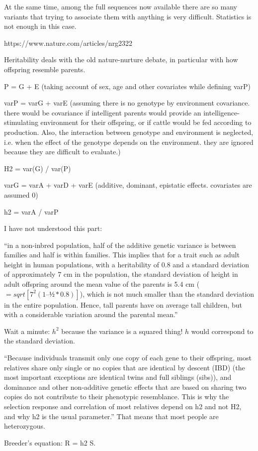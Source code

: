 \documentclass[../main.tex]{subfiles}
\begin{document}
At the same time, among the full sequences now available there are so 
many variants that trying to associate them with anything is very 
difficult. Statistics is not enough in this case.

https://www.nature.com/articles/nrg2322

Heritability deals with the old nature-nurture debate, in particular 
with how offspring resemble parents.

P = G + E (taking account of sex, age and other covariates while 
defining varP)

varP = varG + varE (assuming there is no genotype by environment 
covariance. there would be covariance if intelligent parents would 
provide an intelligence-stimulating environment for their offspring, or 
if cattle would be fed according to production. Also, the interaction 
between genotype and environment is neglected, i.e. when the effect of 
the genotype depends on the environment. they are ignored because they 
are difficult to evaluate.)

H2 = var(G) / var(P)

varG = varA + varD + varE (additive, dominant, epistatic effects. 
covariates are assumed 0)

h2 = varA / varP

I have not understood this part:

\enquote{in a non-inbred population, half of the additive genetic 
variance is between families and half is within families. This implies 
that for a trait such as adult height in human populations, with a 
heritability of 0.8 and a standard deviation of approximately 7 cm in 
the population, the standard deviation of height in adult offspring 
around the mean value of the parents is 5.4 cm ($=sqrt[7^2 (1 – 
½*0.8)]$), which is not much smaller than the standard deviation in the 
entire population. Hence, tall parents have on average tall children, 
but with a considerable variation around the parental mean.}

Wait a minute: $h^2$ because the variance is a squared thing! $h$ would 
correspond to the standard deviation.

\enquote{Because individuals transmit only one copy of each gene to 
their offspring, most relatives share only single or no copies that are 
identical by descent (IBD) (the most important exceptions are identical 
twins and full siblings (sibs)), and dominance and other non-additive 
genetic effects that are based on sharing two copies do not contribute 
to their phenotypic resemblance. This is why the selection response and 
correlation of most relatives depend on h2 and not H2, and why h2 is the 
usual parameter.} That means that most people are heterozygous.

Breeder's equation: R = h2 S.
\end{document}
